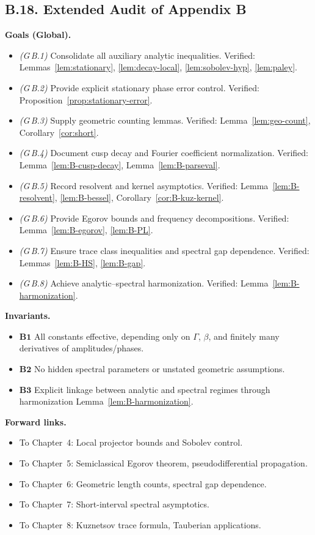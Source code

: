 \subsection*{B.18. Extended Audit of Appendix B}

\noindent
\textbf{Goals (Global).}
\begin{itemize}
  \item \emph{(G\,B.1)} Consolidate all auxiliary analytic inequalities.  
  Verified: Lemmas~\ref{lem:stationary}, \ref{lem:decay-local}, \ref{lem:sobolev-hyp}, \ref{lem:paley}.
  \item \emph{(G\,B.2)} Provide explicit stationary phase error control.  
  Verified: Proposition~\ref{prop:stationary-error}.
  \item \emph{(G\,B.3)} Supply geometric counting lemmas.  
  Verified: Lemma~\ref{lem:geo-count}, Corollary~\ref{cor:short}.
  \item \emph{(G\,B.4)} Document cusp decay and Fourier coefficient normalization.  
  Verified: Lemma~\ref{lem:B-cusp-decay}, Lemma~\ref{lem:B-parseval}.
  \item \emph{(G\,B.5)} Record resolvent and kernel asymptotics.  
  Verified: Lemma~\ref{lem:B-resolvent}, \ref{lem:B-bessel}, Corollary~\ref{cor:B-kuz-kernel}.
  \item \emph{(G\,B.6)} Provide Egorov bounds and frequency decompositions.  
  Verified: Lemma~\ref{lem:B-egorov}, \ref{lem:B-PL}.
  \item \emph{(G\,B.7)} Ensure trace class inequalities and spectral gap dependence.  
  Verified: Lemmas~\ref{lem:B-HS}, \ref{lem:B-gap}.
  \item \emph{(G\,B.8)} Achieve analytic–spectral harmonization.  
  Verified: Lemma~\ref{lem:B-harmonization}.
\end{itemize}

\bigskip
\noindent
\textbf{Invariants.}
\begin{itemize}
  \item \(\mathbf{B1}\) All constants effective, depending only on $\Gamma$, $\beta$, and finitely many derivatives of amplitudes/phases.  
  \item \(\mathbf{B2}\) No hidden spectral parameters or unstated geometric assumptions.  
  \item \(\mathbf{B3}\) Explicit linkage between analytic and spectral regimes through harmonization Lemma~\ref{lem:B-harmonization}.  
\end{itemize}

\bigskip
\noindent
\textbf{Forward links.}
\begin{itemize}
  \item To Chapter~4: Local projector bounds and Sobolev control.  
  \item To Chapter~5: Semiclassical Egorov theorem, pseudodifferential propagation.  
  \item To Chapter~6: Geometric length counts, spectral gap dependence.  
  \item To Chapter~7: Short-interval spectral asymptotics.  
  \item To Chapter~8: Kuznetsov trace formula, Tauberian applications.  
\end{itemize}

